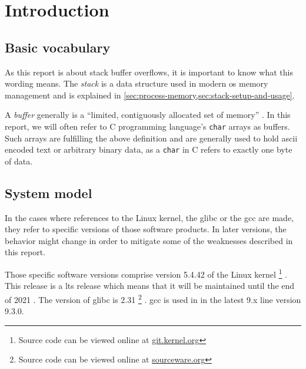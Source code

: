\chapter{Introduction}
\label{chp:introduction}

\section{Basic vocabulary}
As this report is about stack buffer overflows, it is important to know what this wording means.
The \emph{stack} is a data structure used in modern \gls{os} memory management and is explained in \cref{sec:process-memory,sec:stack-setup-and-usage}.

A \emph{buffer} generally is a ``limited, contiguously allocated set of memory'' \cite[12]{Anley2007}.
In this report, we will often refer to C programming language's \texttt{char} arrays as buffers.
Such arrays are fulfilling the above definition and are generally used to hold \gls{ascii} encoded text or arbitrary binary data, as a \texttt{char} in C refers to exactly one byte of data.

\section{System model}
\label{sec:system-model}

In the cases where references to the Linux kernel, the \gls{glibc} or the \gls{gcc} are made, they refer to specific versions of those software products.
In later versions, the behavior might change in order to mitigate some of the weaknesses described in this report.

Those specific software versions comprise version 5.4.42 of the Linux kernel%
	\footnote{Source code can be viewed online at \href{https://git.kernel.org/stable/h/v5.4.42}{git.kernel.org}}%
.
This release is a \gls{lts} release which means that it will be maintained until the end of 2021 \cite{LKO2020}.
The version of \gls{glibc} is 2.31%
	\footnote{Source code can be viewed online at \href{https://sourceware.org/git/?p=glibc.git;a=tree;h=6ee690ef6fa36bf79d2e05b5a30a4f7e10ba3937;hb=9ea3686266dca3f004ba874745a4087a89682617}{sourceware.org}}%
.
\gls{gcc} is used in in the latest 9.x line version 9.3.0.

